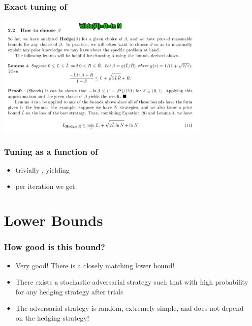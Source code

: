 \documentclass{beamer}
\begin{document}
\begin{frame}
\frametitle{Exact tuning of  \R{$\eta$}}
\includegraphics[height=6cm]{figures/ChoosingEta.png}
\end{frame}


\begin{frame}
\frametitle{Tuning \R{$\eta$} as a function of }
\begin{itemize}
\item trivially , yielding
\item per iteration we get:
\end{itemize}
\end{frame}

\section{Lower Bounds}
\begin{frame}
\frametitle{How good is this bound?}
\begin{itemize}
\item
{\color{blue} Very good!} There is a closely matching lower bound!
\item
There exists a stochastic adversarial strategy such that with high
probability for \alert{any} hedging strategy  after  trials
\item
The adversarial strategy is random, extremely simple, and does not
depend on the hedging strategy! 
\end{itemize}
\end{frame}
\end{document}
